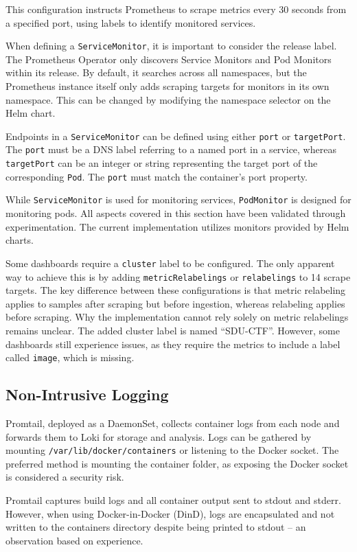 This configuration instructs Prometheus to scrape metrics every 30 seconds from a specified port, using labels to identify monitored services.

When defining a \texttt{ServiceMonitor}, it is important to consider the release label. The Prometheus Operator only discovers Service Monitors and Pod Monitors within its release. By default, it searches across all namespaces, but the Prometheus instance itself only adds scraping targets for monitors in its own namespace. This can be changed by modifying the namespace selector on the Helm chart.

Endpoints in a \texttt{ServiceMonitor} can be defined using either \texttt{port} or \texttt{targetPort}. The \texttt{port} must be a DNS label referring to a named port in a service, whereas \texttt{targetPort} can be an integer or string representing the target port of the corresponding \texttt{Pod}. The \texttt{port} must match the container's port property.

While \texttt{ServiceMonitor} is used for monitoring services, \texttt{PodMonitor} is designed for monitoring pods. All aspects covered in this section have been validated through experimentation. The current implementation utilizes monitors provided by Helm charts.

Some dashboards require a \texttt{cluster} label to be configured. The only apparent way to achieve this is by adding \texttt{metricRelabelings} or \texttt{relabelings} to 14 scrape targets. The key difference between these configurations is that metric relabeling applies to samples after scraping but before ingestion, whereas relabeling applies before scraping. Why the implementation cannot rely solely on metric relabelings remains unclear. The added cluster label is named ``SDU-CTF''. However, some dashboards still experience issues, as they require the metrics to include a label called \texttt{image}, which is missing.

\subsection{Non-Intrusive Logging}
Promtail, deployed as a DaemonSet, collects container logs from each node and forwards them to Loki for storage and analysis. Logs can be gathered by mounting \texttt{/var/lib/docker/containers} or listening to the Docker socket. The preferred method is mounting the container folder, as exposing the Docker socket is considered a security risk.

Promtail captures build logs and all container output sent to stdout and stderr. However, when using Docker-in-Docker (DinD), logs are encapsulated and not written to the containers directory despite being printed to stdout -- an observation based on experience.

